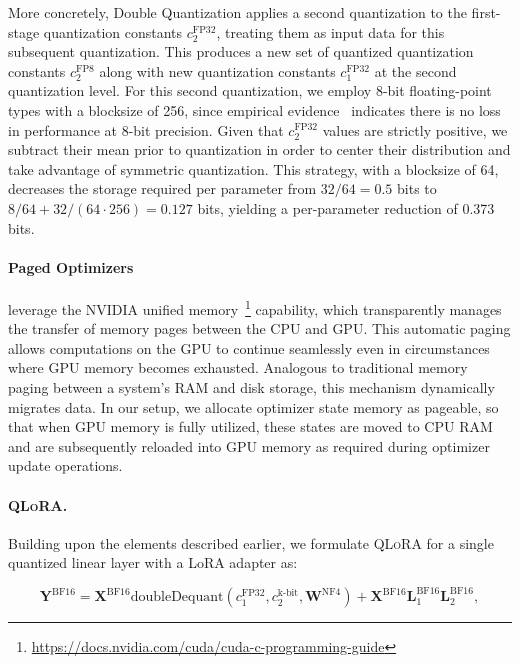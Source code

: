 More concretely, Double Quantization applies a second quantization to the first-stage quantization constants $c_2^{\text{FP32}}$, treating them as input data for this subsequent quantization. This produces a new set of quantized quantization constants $c_2^{\text{FP8}}$ along with new quantization constants $c_1^{\text{FP32}}$ at the second quantization level. For this second quantization, we employ 8-bit floating-point types with a blocksize of 256, since empirical evidence~\citep{dettmers2022case} indicates there is no loss in performance at 8-bit precision. Given that $c_2^{\text{FP32}}$ values are strictly positive, we subtract their mean prior to quantization in order to center their distribution and take advantage of symmetric quantization. This strategy, with a blocksize of 64, decreases the storage required per parameter from $32/64 = 0.5$ bits to $8/64 + 32/(64 \cdot 256) = 0.127$ bits, yielding a per-parameter reduction of 0.373 bits.

\paragraph{Paged Optimizers} leverage the NVIDIA unified memory~\footnote{\tiny \url{https://docs.nvidia.com/cuda/cuda-c-programming-guide}} capability, which transparently manages the transfer of memory pages between the CPU and GPU. This automatic paging allows computations on the GPU to continue seamlessly even in circumstances where GPU memory becomes exhausted. Analogous to traditional memory paging between a system’s RAM and disk storage, this mechanism dynamically migrates data. In our setup, we allocate optimizer state memory as pageable, so that when GPU memory is fully utilized, these states are moved to CPU RAM and are subsequently reloaded into GPU memory as required during optimizer update operations.

\paragraph{\textsc{QLoRA}.} Building upon the elements described earlier, we formulate \textsc{QLoRA} for a single quantized linear layer with a LoRA adapter as:

\begin{equation}
    \mathbf{Y}^{\text{BF16}} =  \mathbf{X}^{\text{BF16}} \text{doubleDequant}(c_1^{\text{FP32}}, c_2^{\text{k-bit}}, \mathbf{W}^{\text{NF4}}) + \mathbf{X}^{\text{BF16}}\mathbf{L}^{\text{BF16}}_1\mathbf{L}^{\text{BF16}}_2,
\end{equation}


